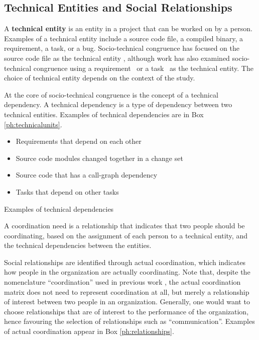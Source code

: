 \subsection{Technical Entities and Social Relationships}
A \textbf{technical entity} is an entity in a project that can be worked on by a person. Examples of a technical entity include a source code file, a compiled binary, a requirement, a task, or a bug. Socio-technical congruence has focused on the source code file as the technical entity \cite{cataldo:cscw:2006, ehrlich2008:gaps}, although work has also examined socio-technical congruence using a requirement~\cite{damian2010:rdc,marczak2009:crossfunctional} or a task~\cite{wolf:ieee:2009} as the technical entity. The choice of technical entity depends on the context of the study.

At the core of socio-technical congruence is the concept of a technical dependency. A technical dependency is a type of dependency between two technical entities. Examples of technical dependencies are in Box \ref{ph:technicalunits}.

\begin{placeholder}[t]
\begin{itemize}
\item Requirements that depend on each other~\cite{marczak:re:2008,marczak2009:crossfunctional}
\item Source code modules changed together in a change set~\cite{cataldo:cscw:2006,cataldo:esem:2008}
\item Source code that has a call-graph dependency~\cite{deSouza2004:thwarts_collaboration}
\item Tasks that depend on other tasks \cite{wolf:ieee:2009}
\end{itemize}
\caption{Examples of technical dependencies}
\label{ph:technicalunits}
\end{placeholder}

A coordination need is a relationship that indicates that two people should be coordinating, based on the assignment of each person to a technical entity, and the technical dependencies between the entities.

Social relationships are identified through actual coordination, which indicates how people in the organization are actually coordinating. Note that, despite the nomenclature ``coordination'' used in previous work \cite{cataldo:cscw:2006}, the actual coordination matrix does not need to represent coordination at all, but merely a relationship of interest between two people in an organization. Generally, one would want to choose relationships that are of interest to the performance of the organization, hence favouring the selection of relationships such as ``communication''. Examples of actual coordination appear in Box \ref{ph:relationships}.

